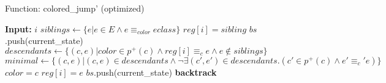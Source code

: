 \begin{algorithm}
\caption{Function: colored\_jump' (optimized)}
\label{alg:colored_jump_optimized}
\begin{algorithmic}
\STATE \textbf{Input:} $i$
\STATE $siblings \gets \{e | e \in E \land e \equiv_{color} eclass\}$
    \STATE $reg[i] = sibling$
    \STATE $bs$.push(current\_state)
\ENDFOR
\STATE $descendants \gets \{ (c, e) | color \in p^+(c) \land reg[i] \equiv_c e \land e \notin siblings \}$
\STATE $minimal \gets \{ (c, e) | (c, e) \in descendants \land \lnot \exists (c', e') \in descendants. (c' \in p^+(c) \land e' \equiv_c' e) \}$
    \STATE $color = c$
    \STATE $reg[i] = e$
    \STATE $bs$.push(current\_state)
\ENDFOR
\STATE \textbf{backtrack}
\end{algorithmic}
\end{algorithm}